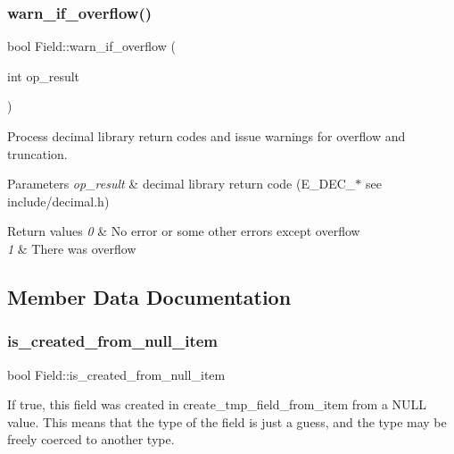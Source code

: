 \mbox{\label{classField_a910faac3cd041daebe318e9dbf1d2297}} 
\subsubsection{\texorpdfstring{warn\+\_\+if\+\_\+overflow()}{warn\_if\_overflow()}}
{\footnotesize\ttfamily bool Field\+::warn\+\_\+if\+\_\+overflow (\begin{DoxyParamCaption}\item[{int}]{op\+\_\+result }\end{DoxyParamCaption})}

Process decimal library return codes and issue warnings for overflow and truncation.


\begin{DoxyParams}{Parameters}
{\em op\+\_\+result} & decimal library return code (E\+\_\+\+D\+E\+C\+\_\+$\ast$ see include/decimal.\+h)\\
\hline
\end{DoxyParams}

\begin{DoxyRetVals}{Return values}
{\em 0} & No error or some other errors except overflow \\
\hline
{\em 1} & There was overflow \\
\hline
\end{DoxyRetVals}


\subsection{Member Data Documentation}
\mbox{\label{classField_ad5afa4cc66ad7f3f58a1fdc4591b93a6}} 
\subsubsection{\texorpdfstring{is\+\_\+created\+\_\+from\+\_\+null\+\_\+item}{is\_created\_from\_null\_item}}
{\footnotesize\ttfamily bool Field\+::is\+\_\+created\+\_\+from\+\_\+null\+\_\+item}

If true, this field was created in create\+\_\+tmp\+\_\+field\+\_\+from\+\_\+item from a N\+U\+LL value. This means that the type of the field is just a guess, and the type may be freely coerced to another type.


